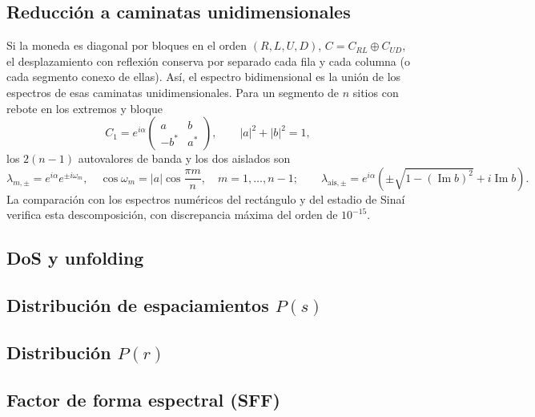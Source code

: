 \subsection{Reducción a caminatas unidimensionales}
Si la moneda es diagonal por bloques en el orden $(R,L,U,D)$,
$C=C_{RL}\oplus C_{UD}$, el desplazamiento con reflexión conserva por
separado cada fila y cada columna (o cada segmento conexo de ellas).
Así, el espectro bidimensional es la unión de los espectros de esas
caminatas unidimensionales. Para un segmento de $n$ sitios con rebote en
los extremos y bloque
\begin{equation}
 C_1=e^{i\alpha}\begin{pmatrix}a&b\\-b^*&a^*\end{pmatrix},
 \qquad |a|^2+|b|^2=1,
\end{equation}
los $2(n-1)$ autovalores de banda y los dos aislados son
\begin{equation}
 \lambda_{m,\pm}=e^{i\alpha}e^{\pm i\omega_m},\quad
 \cos\omega_m=|a|\cos\frac{\pi m}{n},\quad m=1,\ldots,n-1;
 \qquad
 \lambda_{\mathrm{ais},\pm}=e^{i\alpha}
 \left(\pm\sqrt{1-(\operatorname{Im}b)^2}
       +i\operatorname{Im}b\right).
\end{equation}
La comparación con los espectros numéricos del rectángulo y del estadio
de Sinaí verifica esta descomposición, con discrepancia máxima del orden
de $10^{-15}$.

\subsection{DoS y unfolding} %

\subsection{Distribución de espaciamientos \texorpdfstring{$P(s)$}{P(s)}} %

\subsection{Distribución \texorpdfstring{$P(r)$}{P(r)}} %

\subsection{Factor de forma espectral (SFF)} %

